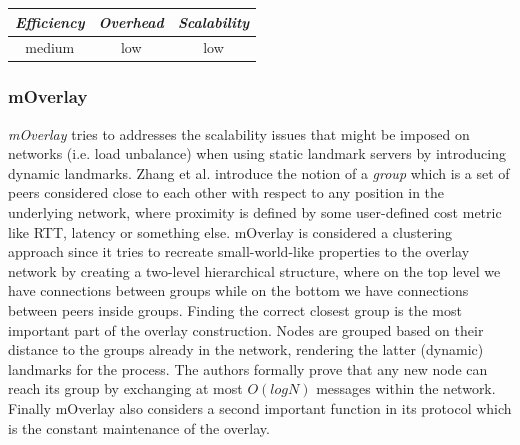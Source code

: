 \begin{center}
\begin{tabular}{ccc}
\emph{Efficiency} & \emph{Overhead} & \emph{Scalability} \\
\hline
medium &
low &
low
\end{tabular}
\end{center}

\subsubsection{mOverlay}
\emph{mOverlay} \cite{ZZZSZ2004} tries to addresses the scalability issues that
might be imposed on networks (i.e. load unbalance) when using static landmark
servers by introducing dynamic landmarks. Zhang et al. introduce the notion of a
\emph{group} which is a set of peers considered close to each other with respect
to any position in the underlying network, where proximity is defined by some
user-defined cost metric like RTT, latency or something else. mOverlay is
considered a clustering approach since it tries to recreate small-world-like
properties to the overlay network by creating a two-level hierarchical
structure, where on the top level we have connections between groups while on
the bottom we have connections between peers inside groups. Finding the correct
closest group is the most important part of the overlay construction. Nodes are
grouped based on their distance to the groups already in the network, rendering
the latter (dynamic) landmarks for the process. The authors formally prove
that any new node can reach its group by exchanging at most $O(logN)$ messages
within the network. Finally mOverlay also considers a second important function
in its protocol which is the constant maintenance of the overlay.

